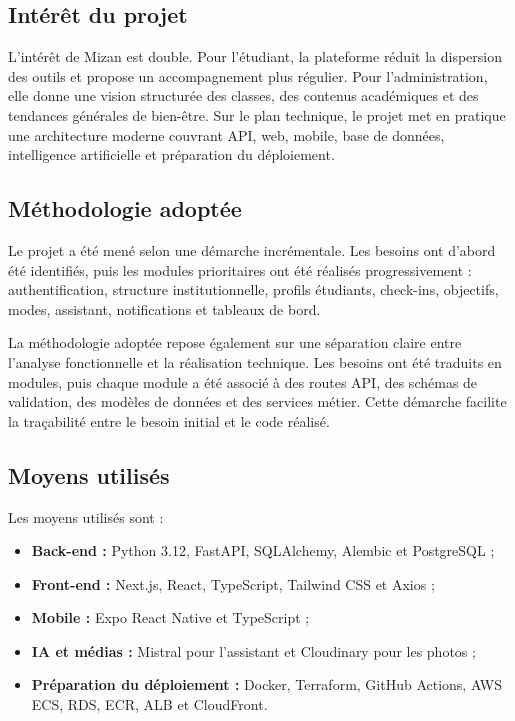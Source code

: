 \documentclass{rapportENSET}
\begin{document}
\subsection*{Intérêt du projet}
L'intérêt de Mizan est double. Pour l'étudiant, la plateforme réduit la dispersion des outils et propose un accompagnement plus régulier. Pour l'administration, elle donne une vision structurée des classes, des contenus académiques et des tendances générales de bien-être. Sur le plan technique, le projet met en pratique une architecture moderne couvrant API, web, mobile, base de données, intelligence artificielle et préparation du déploiement.

\subsection*{Méthodologie adoptée}
Le projet a été mené selon une démarche incrémentale. Les besoins ont d'abord été identifiés, puis les modules prioritaires ont été réalisés progressivement : authentification, structure institutionnelle, profils étudiants, check-ins, objectifs, modes, assistant, notifications et tableaux de bord.

La méthodologie adoptée repose également sur une séparation claire entre l'analyse fonctionnelle et la réalisation technique. Les besoins ont été traduits en modules, puis chaque module a été associé à des routes API, des schémas de validation, des modèles de données et des services métier. Cette démarche facilite la traçabilité entre le besoin initial et le code réalisé.

\subsection*{Moyens utilisés}
Les moyens utilisés sont :
\begin{itemize}
    \item \textbf{Back-end :} Python 3.12, FastAPI, SQLAlchemy, Alembic et PostgreSQL ;
    \item \textbf{Front-end :} Next.js, React, TypeScript, Tailwind CSS et Axios ;
    \item \textbf{Mobile :} Expo React Native et TypeScript ;
    \item \textbf{IA et médias :} Mistral pour l'assistant et Cloudinary pour les photos ;
    \item \textbf{Préparation du déploiement :} Docker, Terraform, GitHub Actions, AWS ECS, RDS, ECR, ALB et CloudFront.
\end{itemize}
\end{document}
